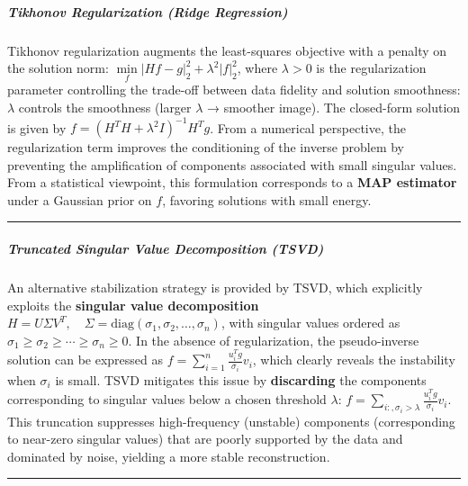 \documentclass[11pt]{article}
\begin{document}
\hypertarget{tikhonov-regularization-ridge-regression}{%
\subparagraph{\texorpdfstring{\textbf{Tikhonov Regularization (Ridge
Regression)}}{Tikhonov Regularization (Ridge Regression)}}\label{tikhonov-regularization-ridge-regression}}

Tikhonov regularization augments the least-squares objective with a
penalty on the solution norm:
\(\underset{f}{\min} |Hf - g|_2^2 + \lambda^2 |f|_2^2\), where
\(\lambda > 0\) is the regularization parameter controlling the
trade-off between data fidelity and solution smoothness: \(\lambda\)
controls the smoothness (larger \(\lambda\) → smoother image). The
closed-form solution is given by
\(f = (H^T H + \lambda^2 I)^{-1} H^T g\). From a numerical perspective,
the regularization term improves the conditioning of the inverse problem
by preventing the amplification of components associated with small
singular values. From a statistical viewpoint, this formulation
corresponds to a \textbf{MAP estimator} under a Gaussian prior on \(f\),
favoring solutions with small energy.

\begin{center}\rule{0.5\linewidth}{0.5pt}\end{center}

\hypertarget{truncated-singular-value-decomposition-tsvd}{%
\subparagraph{\texorpdfstring{\textbf{Truncated Singular Value
Decomposition
(TSVD)}}{Truncated Singular Value Decomposition (TSVD)}}\label{truncated-singular-value-decomposition-tsvd}}

An alternative stabilization strategy is provided by TSVD, which
explicitly exploits the \textbf{singular value decomposition}
\(H = U \Sigma V^T, \quad \Sigma = \mathrm{diag}(\sigma_1, \sigma_2, \ldots, \sigma_n)\),
with singular values ordered as
\(\sigma_1 \ge \sigma_2 \ge \cdots \ge \sigma_n \ge 0\). In the absence
of regularization, the pseudo-inverse solution can be expressed as
\(f = \sum\limits_{i=1}^{n} \frac{u_i^T g}{\sigma_i} v_i\), which
clearly reveals the instability when \(\sigma_i\) is small. TSVD
mitigates this issue by \textbf{discarding} the components corresponding
to singular values below a chosen threshold \(\lambda\):
\(f = \sum\limits_{i:,\sigma_i > \lambda} \frac{u_i^T g}{\sigma_i} v_i\).
This truncation suppresses high-frequency (unstable) components
(corresponding to near-zero singular values) that are poorly supported
by the data and dominated by noise, yielding a more stable
reconstruction.

\begin{center}\rule{0.5\linewidth}{0.5pt}\end{center}
\end{document}
